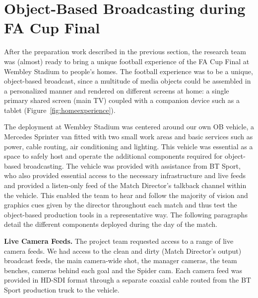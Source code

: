 \documentclass[sigchi-a]{acmart}
\begin{document}
\section{Object-Based Broadcasting during FA Cup Final}

After the preparation work described in the previous section, the research team
was (almost) ready to bring a unique football experience of the FA Cup Final
at Wembley Stadium to people's homes. The football experience was to be a unique, object-based broadcast, since a
multitude of media objects could be assembled in a personalized manner and rendered on
different screens at home: a single primary shared screen (main TV) coupled with
a companion device such as a tablet (Figure~\ref{fig:homeexperience}).

The deployment at Wembley Stadium was centered around our own OB vehicle, a
Mercedes Sprinter van fitted with two small work areas and basic services
such as power, cable routing, air conditioning and lighting. This vehicle was
essential as a space to safely host and operate the additional components
required for object-based broadcasting. The vehicle was provided with assistance
from BT Sport, who also provided essential access to the necessary infrastructure
and live feeds and provided a listen-only feed of the Match Director's talkback
channel within the vehicle. This enabled the team to hear and follow the
majority of vision and graphics cues given by the director throughout each
match and thus test the object-based production tools in a representative way.
The following paragraphs detail the different components deployed during the day
of the match.

\vspace{5pt}\noindent\textbf{Live Camera Feeds.} The project team requested
access to a range of live camera feeds. We had access to the clean and dirty
(Match Director's output) broadcast feeds, the main camera-wide shot, the
manager cameras, the team benches, cameras behind each goal and the Spider
cam. Each camera feed was provided in HD-SDI format through a separate coaxial cable
routed from the BT Sport production truck to the vehicle.
\end{document}
